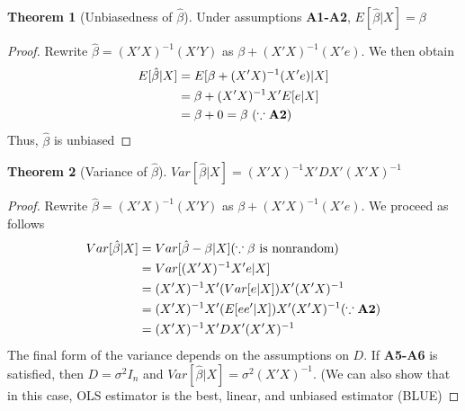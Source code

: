 \documentclass[12pt]{article}
\theoremstyle{definition}
\theoremstyle{property}
\theoremstyle{assumption}
\theoremstyle{example}
\theoremstyle{comment}
\newtheorem{theorem}{Theorem}[section]
\begin{document}
\begin{mdframed}[backgroundcolor=yellow!5] 
\begin{theorem}[Unbiasedness of $\hat{\beta}$]
Under assumptions \textbf{A1-A2}, $E[\hat{\beta}|X]=\beta$
\begin{proof}
Rewrite $\hat{\beta}=(X'X)^{-1}(X'Y)$ as $\beta+(X'X)^{-1}(X'e)$. We then obtain
\[
\begin{aligned}
E[\hat{\beta}|X]&=E[\beta+(X'X)^{-1}(X'e)|X]\\
 &=\beta+ (X'X)^{-1}X'E[e|X] \\
 &=\beta+0 = \beta \ (\because \text{\textbf{A2}})
\end{aligned}
\]
Thus, $\hat{\beta}$ is unbiased
\end{proof}
\end{theorem}
\begin{theorem}[Variance of $\hat{\beta}$]
 $Var[\hat{\beta}|X]=(X'X)^{-1}X'DX'(X'X)^{-1}$
\begin{proof}
Rewrite $\hat{\beta}=(X'X)^{-1}(X'Y)$ as $\beta+(X'X)^{-1}(X'e)$. We proceed as follows
\[
\begin{aligned}
Var[\hat{\beta}|X]&=Var[\hat{\beta}-\beta|X] (\because \beta\ \text{is nonrandom})\\
 &=Var[(X'X)^{-1}X'e|X] \\
  &=(X'X)^{-1}X'(Var[e|X])X'(X'X)^{-1} \\
 &=(X'X)^{-1}X'(E[ee'|X])X'(X'X)^{-1}  (\because \text{\textbf{A2}})\\
&=(X'X)^{-1}X'DX'(X'X)^{-1} 
\end{aligned}
\]
The final form of the variance depends on the assumptions on $D$. If \textbf{A5-A6} is satisfied, then $D=\sigma^2I_n$ and $Var[\hat{\beta}|X] = \sigma^2(X'X)^{-1}$. (We can also show that in this case, OLS estimator is the best, linear, and unbiased estimator (BLUE)
\end{proof}
\end{theorem}
\end{mdframed} \par
\end{document}
